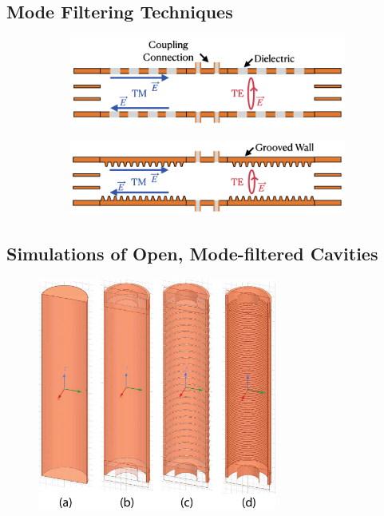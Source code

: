 \subsection{Mode Filtering Techniques}
\label{sec:chap6-mode-filtering-techniques}

\begin{figure}[htbp]
    \centering
    \begin{subfigure}{0.7\textwidth}
        \centering
        \includegraphics*[width=\textwidth]{figs/Chapter-6/230608_insulator_mode_filter_cartoon.png}
        \caption{}
    \end{subfigure}
    \hfill
    \begin{subfigure}{0.7\textwidth}
        \centering
        \includegraphics*[width=\textwidth]{figs/Chapter-6/230608_grooved_mode_filter_cartoon.png}
        \caption{}
    \end{subfigure}
    \caption{}
\end{figure}

\subsection{Simulations of Open, Mode-filtered Cavities}

\begin{figure}[htbp]
    \centering
    \includegraphics*[width=0.7\textwidth]{figs/Chapter-6/230610_cavity_variations.png}
    \caption{}
\end{figure}


